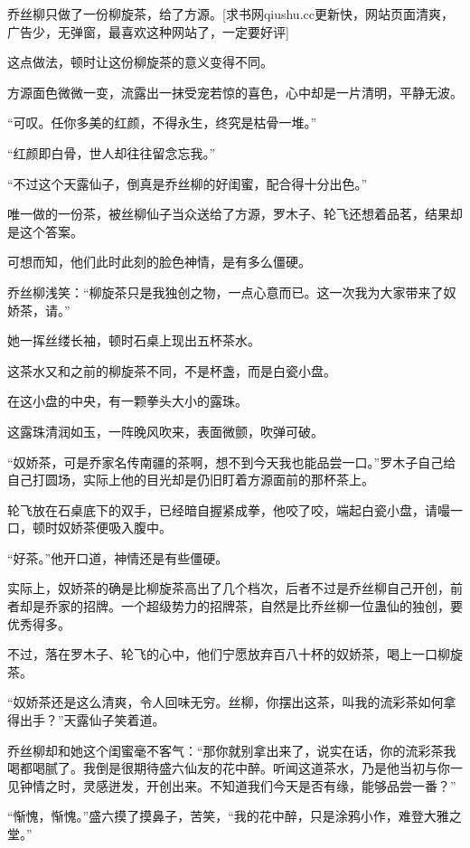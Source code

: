 
\begin{this_body}

乔丝柳只做了一份柳旋茶，给了方源。[求书网qiushu.cc更新快，网站页面清爽，广告少，无弹窗，最喜欢这种网站了，一定要好评]

这点做法，顿时让这份柳旋茶的意义变得不同。

方源面色微微一变，流露出一抹受宠若惊的喜色，心中却是一片清明，平静无波。

“可叹。任你多美的红颜，不得永生，终究是枯骨一堆。”

“红颜即白骨，世人却往往留念忘我。”

“不过这个天露仙子，倒真是乔丝柳的好闺蜜，配合得十分出色。”

唯一做的一份茶，被丝柳仙子当众送给了方源，罗木子、轮飞还想着品茗，结果却是这个答案。

可想而知，他们此时此刻的脸色神情，是有多么僵硬。

乔丝柳浅笑：“柳旋茶只是我独创之物，一点心意而已。这一次我为大家带来了奴娇茶，请。”

她一挥丝缕长袖，顿时石桌上现出五杯茶水。

这茶水又和之前的柳旋茶不同，不是杯盏，而是白瓷小盘。

在这小盘的中央，有一颗拳头大小的露珠。

这露珠清润如玉，一阵晚风吹来，表面微颤，吹弹可破。

“奴娇茶，可是乔家名传南疆的茶啊，想不到今天我也能品尝一口。”罗木子自己给自己打圆场，实际上他的目光却是仍旧盯着方源面前的那杯茶上。

轮飞放在石桌底下的双手，已经暗自握紧成拳，他咬了咬，端起白瓷小盘，请嘬一口，顿时奴娇茶便吸入腹中。

“好茶。”他开口道，神情还是有些僵硬。

实际上，奴娇茶的确是比柳旋茶高出了几个档次，后者不过是乔丝柳自己开创，前者却是乔家的招牌。一个超级势力的招牌茶，自然是比乔丝柳一位蛊仙的独创，要优秀得多。

不过，落在罗木子、轮飞的心中，他们宁愿放弃百八十杯的奴娇茶，喝上一口柳旋茶。

“奴娇茶还是这么清爽，令人回味无穷。丝柳，你摆出这茶，叫我的流彩茶如何拿得出手？”天露仙子笑着道。

乔丝柳却和她这个闺蜜毫不客气：“那你就别拿出来了，说实在话，你的流彩茶我喝都喝腻了。我倒是很期待盛六仙友的花中醉。听闻这道茶水，乃是他当初与你一见钟情之时，灵感迸发，开创出来。不知道我们今天是否有缘，能够品尝一番？”

“惭愧，惭愧。”盛六摸了摸鼻子，苦笑，“我的花中醉，只是涂鸦小作，难登大雅之堂。”


\end{this_body}
